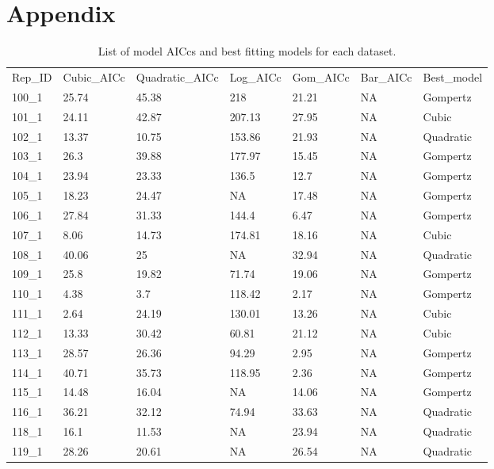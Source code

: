 \documentclass[titlepage]{article}
\begin{document}




\section{Appendix}

\setcounter{table}{0}
\renewcommand{\thetable}{S\arabic{table}}



\begin{longtable}{lllllll}
 \caption{\footnotesize List of model AICcs and best fitting models for each dataset.} \label {Table S1}\\
Rep\_ID & Cubic\_AICc & Quadratic\_AICc & Log\_AICc & Gom\_AICc & Bar\_AICc & Best\_model \\
100\_1 & 25.74 & 45.38 & 218 & 21.21 & NA & Gompertz \\
101\_1 & 24.11 & 42.87 & 207.13 & 27.95 & NA & Cubic \\
102\_1 & 13.37 & 10.75 & 153.86 & 21.93 & NA & Quadratic \\
103\_1 & 26.3 & 39.88 & 177.97 & 15.45 & NA & Gompertz \\
104\_1 & 23.94 & 23.33 & 136.5 & 12.7 & NA & Gompertz \\
105\_1 & 18.23 & 24.47 & NA & 17.48 & NA & Gompertz \\
106\_1 & 27.84 & 31.33 & 144.4 & 6.47 & NA & Gompertz \\
107\_1 & 8.06 & 14.73 & 174.81 & 18.16 & NA & Cubic \\
108\_1 & 40.06 & 25 & NA & 32.94 & NA & Quadratic \\
109\_1 & 25.8 & 19.82 & 71.74 & 19.06 & NA & Gompertz \\
110\_1 & 4.38 & 3.7 & 118.42 & 2.17 & NA & Gompertz \\
111\_1 & 2.64 & 24.19 & 130.01 & 13.26 & NA & Cubic \\
112\_1 & 13.33 & 30.42 & 60.81 & 21.12 & NA & Cubic \\
113\_1 & 28.57 & 26.36 & 94.29 & 2.95 & NA & Gompertz \\
114\_1 & 40.71 & 35.73 & 118.95 & 2.36 & NA & Gompertz \\
115\_1 & 14.48 & 16.04 & NA & 14.06 & NA & Gompertz \\
116\_1 & 36.21 & 32.12 & 74.94 & 33.63 & NA & Quadratic \\
118\_1 & 16.1 & 11.53 & NA & 23.94 & NA & Quadratic \\
119\_1 & 28.26 & 20.61 & NA & 26.54 & NA & Quadratic \\

\end{longtable}
\end{document}
